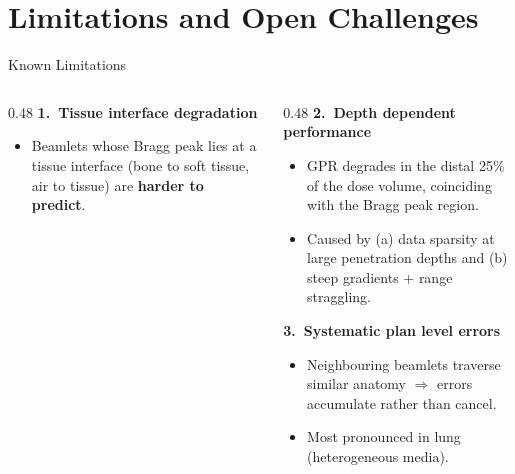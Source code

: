 \documentclass[aspectratio=169, 10pt]{beamer}
\begin{document}
\section{Limitations and Open Challenges}

\begin{frame}{Known Limitations}
  \begin{columns}[T]
    \begin{column}{0.48\textwidth}
      \textbf{1.\ Tissue interface degradation}
      \begin{itemize}\setlength{\itemsep}{3pt}
        \item Beamlets whose Bragg peak lies at a tissue interface
              (bone to soft tissue, air to tissue) are \textbf{harder to
              predict}.
      \end{itemize}
    \end{column}
    \begin{column}{0.48\textwidth}
      \textbf{2.\ Depth dependent performance}
      \begin{itemize}\setlength{\itemsep}{3pt}
        \item GPR degrades in the distal 25\% of the dose volume,
              coinciding with the Bragg peak region.
        \item Caused by (a) data sparsity at large penetration depths
              and (b) steep gradients + range straggling.
      \end{itemize}

      \vspace{6pt}
      \textbf{3.\ Systematic plan level errors}
      \begin{itemize}\setlength{\itemsep}{3pt}
        \item Neighbouring beamlets traverse similar anatomy
              $\Rightarrow$ errors accumulate rather than cancel.
        \item Most pronounced in lung (heterogeneous media).
      \end{itemize}
    \end{column}
  \end{columns}
\end{frame}
\end{document}
